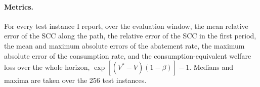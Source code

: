 \paragraph{Metrics.} For every test instance I report, over the evaluation window, the mean relative error of the SCC along the path, the relative error of the SCC in the first period, the mean and maximum absolute errors of the abatement rate, the maximum absolute error of the consumption rate, and the consumption-equivalent welfare loss over the whole horizon, $\exp[(V^* - V)(1-\beta)] - 1$. Medians and maxima are taken over the 256 test instances.
